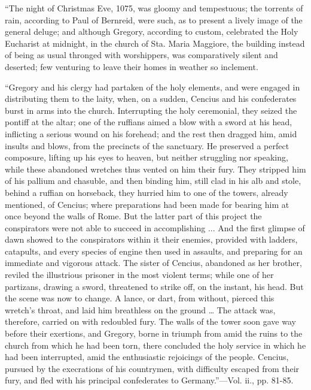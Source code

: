``The
night of Christmas Eve, 1075, was gloomy and tempestuous; the torrents
of rain, according to Paul of Bernreid, were such, as to present a
lively image of the general deluge; and although Gregory, according to
custom, celebrated the Holy Eucharist at midnight, in the church of
Sta. Maria Maggiore, the building instead of being as usual thronged
with worshippers, was comparatively silent and deserted; few venturing
to leave their homes in weather so inclement.

``Gregory
and his clergy had partaken of the holy elements, and were engaged in
distributing them to the laity, when, on a sudden, Cencius and his
confederates burst in arms into the church. Interrupting the holy
ceremonial, they seized the pontiff at the altar; one of the ruffians
aimed a blow with a sword at his head, inflicting a serious wound on
his forehead; and the rest then dragged him, amid insults and blows,
from the precincts of the sanctuary. He preserved a perfect composure,
lifting up his eyes to heaven, but neither struggling nor speaking,
while these abandoned wretches thus vented on him their fury. They
stripped him of his pallium and chasuble, and then binding him, still
clad in his alb and stole, behind a ruffian on horseback, they hurried
him to one of the towers, already mentioned, of Cencius; where
preparations had been made for bearing him at once beyond the walls of
Rome. But the latter part of this project the conspirators were not able to succeed in
accomplishing ... And the first glimpse of dawn showed to the
conspirators within it their enemies, provided with ladders,
catapults, and every species of engine then used in assaults, and
preparing for an immediate and vigorous attack. The sister of Cencius,
abandoned as her brother, reviled the illustrious prisoner in the most
violent terms; while one of her partizans, drawing a sword, threatened
to strike off, on the instant, his head. But the scene was now to
change. A lance, or dart, from without, pierced this wretch's throat,
and laid him breathless on the ground … The attack was, therefore,
carried on with redoubled fury. The walls of the tower soon gave way
before their exertions, and Gregory, borne in triumph from amid the
ruins to the church from which he had been torn, there concluded the
holy service in which he had been interrupted, amid the enthusiastic
rejoicings of the people. Cencius, pursued by the execrations of his
countrymen, with difficulty escaped from their fury, and fled with his
principal confederates to Germany.''—Vol. ii., pp. 81-85.

